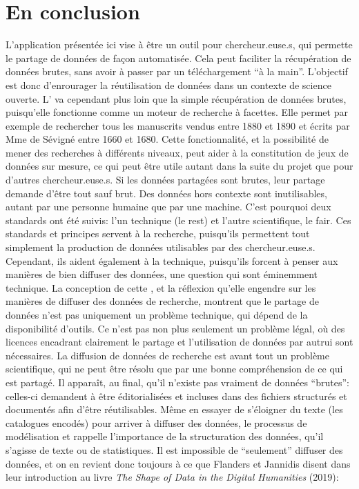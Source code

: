 \section{En conclusion}
L'application présentée ici vise à être un outil pour chercheur.euse.s, qui permette le partage de données de façon automatisée. Cela peut faciliter la récupération de données brutes, sans avoir à passer par un téléchargement \enquote{à la main}. L'objectif est donc d'enrourager la réutilisation de données dans un contexte de science ouverte. L'\api{} va cependant plus loin que la simple récupération de données brutes, puisqu'elle fonctionne comme un moteur de recherche à facettes. Elle permet par exemple de rechercher tous les manuscrits vendus entre 1880 et 1890 et écrits par Mme de Sévigné entre 1660 et 1680. Cette fonctionnalité, et la possibilité de mener des recherches à différents niveaux, peut aider à la constitution de jeux de données sur mesure, ce qui peut être utile autant dans la suite du projet que pour d'autres chercheur.euse.s. Si les données partagées sont brutes, leur partage demande d'être tout sauf brut. Des données hors contexte sont inutilisables, autant par une personne humaine que par une machine. C'est pourquoi deux standards ont été suivis: l'un technique (le \gls{rest}) et l'autre scientifique, le \gls{fair}. Ces standards et principes servent à la recherche, puisqu'ils permettent tout simplement la production de données utilisables par des chercheur.euse.s. Cependant, ils aident également à la technique, puisqu'ils forcent à penser aux manières de bien diffuser des données, une question qui sont éminemment technique. La conception de cette \api{}, et la réflexion qu'elle engendre sur les manières de diffuser des données de recherche, montrent que le partage de données n'est pas uniquement un problème technique, qui dépend de la disponibilité d'outils. Ce n'est pas non plus seulement un problème légal, où des licences encadrant clairement le partage et l'utilisation de données par autrui sont nécessaires. La diffusion de données de recherche est avant tout un problème scientifique, qui ne peut être résolu que par une bonne compréhension de ce qui est partagé. Il apparaît, au final, qu'il n'existe pas vraiment de données \enquote{brutes}: celles-ci demandent à être éditorialisées et incluses dans des fichiers structurés et documentés afin d'être réutilisables. Même en essayer de s'éloigner du texte (les catalogues encodés) pour arriver à diffuser des données, le processus de modélisation et rappelle l'importance de la structuration des données, qu'il s'agisse de texte ou de statistiques. Il est impossible de \enquote{seulement} diffuser des données, et on en revient donc toujours à ce que Flanders et Jannidis disent dans leur introduction au livre \textit{The Shape of Data in the Digital Humanities} (2019):

